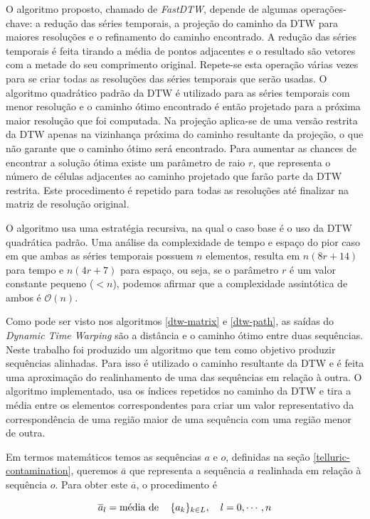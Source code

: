 O algoritmo proposto, chamado de \textit{FastDTW}, depende de algumas operações-chave: a redução das séries temporais, a projeção do caminho da DTW para maiores resoluções e o refinamento do caminho encontrado. A redução das séries temporais é feita tirando a média de pontos adjacentes e o resultado são vetores com a metade do seu comprimento original. Repete-se esta operação várias vezes para se criar todas as resoluções das séries temporais que serão usadas. O algoritmo quadrático padrão da DTW é utilizado para as séries temporais com menor resolução e o caminho ótimo encontrado é então projetado para a próxima maior resolução que foi computada. Na projeção aplica-se de uma versão restrita da DTW apenas na vizinhança próxima do caminho resultante da projeção, o que não garante que o caminho ótimo será encontrado. Para aumentar as chances de encontrar a solução ótima existe um parâmetro de raio $r$, que representa o número de células adjacentes ao caminho projetado que farão parte da DTW restrita. Este procedimento é repetido para todas as resoluções até finalizar na matriz de resolução original.

O algoritmo usa uma estratégia recursiva, na qual o caso base é o uso da DTW quadrática padrão. Uma análise da complexidade de tempo e espaço do pior caso em que ambas as séries temporais possuem $n$ elementos, resulta em $n(8r + 14)$ para tempo e $n(4r + 7)$ para espaço, ou seja, se o parâmetro $r$ é um valor constante pequeno ($<n$), podemos afirmar que a complexidade assintótica de ambos é $\mathcal{O}(n)$.

Como pode ser visto nos algoritmos \ref{dtw-matrix} e \ref{dtw-path}, as saídas do \textit{Dynamic Time Warping} são a distância e o caminho ótimo entre duas sequências. Neste trabalho foi produzido um algoritmo que tem como objetivo produzir sequências alinhadas. Para isso é utilizado o caminho resultante da DTW e é feita uma aproximação do realinhamento de uma das sequências em relação à outra. O algoritmo implementado, usa os índices repetidos no caminho da DTW e tira a média entre os elementos correspondentes para criar um valor representativo da correspondência de uma região maior de uma sequência com uma região menor de outra.

Em termos matemáticos temos as sequências $a$ e $o$, definidas na seção \ref{telluric-contamination}, queremos $\overline{a}$ que representa a sequência $a$ realinhada em relação à sequência $o$. Para obter este $\overline{a}$, o procedimento é

\begin{equation*}
    \overline{a}_l = \parbox[t]{1.8cm}{média de} \{a_k\}_{k \in L}, \quad  l = 0, \cdots, n
\end{equation*}

